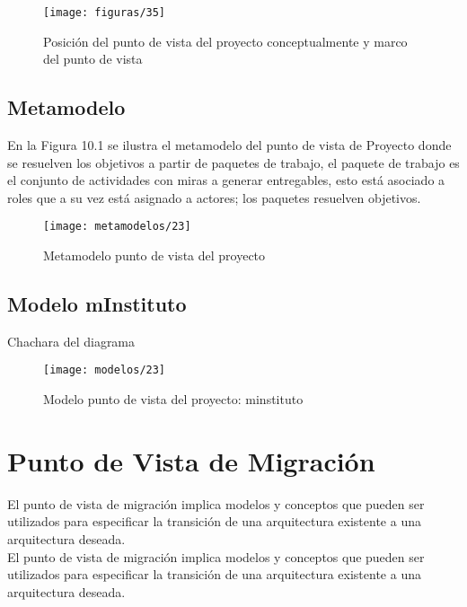   \begin{figure}[H]
	\centering
	\texttt{[image: figuras/35]}
	\captionsetup{width=.95\textwidth}
	\caption{Posición del punto de vista del proyecto conceptualmente y marco del punto de vista}
	\label{figura35}
  \end{figure}

  \subsection{Metamodelo}
  En la Figura 10.1 se ilustra el metamodelo del punto de vista de Proyecto donde se resuelven los objetivos a partir de paquetes de trabajo, el paquete de trabajo es el conjunto de actividades con miras a generar entregables, esto está asociado a roles que a su vez está asignado a actores; los paquetes resuelven objetivos.

  \begin{figure}[H]
	\centering
	\texttt{[image: metamodelos/23]}
	\captionsetup{width=.95\textwidth}
	\caption{Metamodelo punto de vista del proyecto}
	\label{metamodelo23}
  \end{figure}

  \subsection{Modelo mInstituto}Chachara del diagrama
  \begin{figure}[H]
	\centering
	\texttt{[image: modelos/23]}
	\captionsetup{width=.95\textwidth}
	\caption{Modelo punto de vista del proyecto: minstituto}
	\label{modelo23}
  \end{figure}
  
\section{Punto de Vista de Migración}
El punto de vista de migración implica modelos y conceptos que pueden ser utilizados para especificar la transición de una arquitectura existente a una arquitectura deseada. \\
El punto de vista de migración implica modelos y conceptos que pueden ser utilizados para especificar la transición de una arquitectura existente a una arquitectura deseada.

